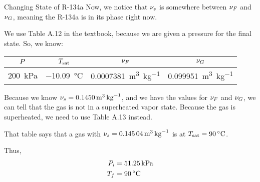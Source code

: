 \begin{example}[Problem 4.112]{Changing State of R-134a}
  Now, we notice that $\nu_{s}$ is somewhere between $\nu_{F}$ and $\nu_{G}$, meaning the R-134a is in its  phase right now.

  We use Table A.12 in the textbook, because we are given a pressure for the final state.
  So, we know:
  \begin{center}
    \begin{tabular}{cccc}
      \toprule
      $P$ & $T_{\mathrm{sat}}$ & $\nu_{F}$ & $\nu_{G}$ \\
      \midrule
      \SI{200}{\kilo\pascal} & \SI{-10.09}{\degreeCelsius} & \SI{0.0007381}{\meter\cubed\per\kilo\gram} & \SI{0.099951}{\meter\cubed\per\kilo\gram} \\
      \bottomrule
    \end{tabular}
  \end{center}

  Because we know $\nu_{s} = \SI{0.1450}{\meter\cubed\per\kilo\gram}$, and we have the values for $\nu_{F}$ and $\nu_{G}$, we can tell that the gas is not in a superheated vapor state.
  Because the gas is superheated, we need to use Table A.13 instead.

  That table says that a gas with $\nu_{s} = \SI{0.14504}{\meter\cubed\per\kilo\gram}$ is at $\SaturatedTemp = \SI{90}{\degreeCelsius}$.

  Thus,
  \begin{align*}
    \Pressure_{i} &= \SI{51.25}{\kilo\pascal} \\
    \Temp_{f} &= \SI{90}{\degreeCelsius}
  \end{align*}
\end{example}

